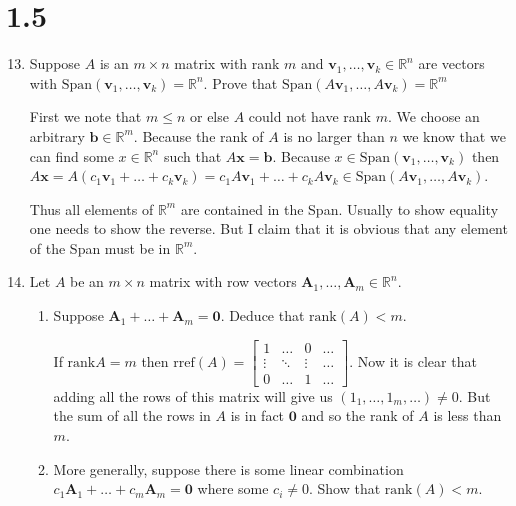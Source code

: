 \documentclass[letterpaper]{article}
\begin{document}
\section*{1.5}
\begin{enumerate}
\setcounter{enumi}{12}
\item
Suppose $A$ is an $m\times n$ matrix with rank $m$ and $\mathbf{v}_1,\dots,\mathbf{v}_k\in \mathbb{R}^n$ are vectors with $\text{Span}(\mathbf{v}_1,\dots,\mathbf{v}_k)=\mathbb{R}^n$. Prove that $\text{Span}(A\mathbf{v}_1,\dots,A\mathbf{v}_k)=\mathbb{R}^m$

First we note that $m\le n$ or else $A$ could not have rank $m$.
We choose an arbitrary $\mathbf{b}\in \mathbb{R}^m$. Because the rank of $A$ is no larger than $n$ we know that we can find some $x\in \mathbb{R}^n$ such that $A\mathbf{x}=\mathbf{b}$. Because $x\in \text{Span}(\mathbf{v}_1,\dots,\mathbf{v}_k)$ then $A\mathbf{x}=A(c_1\mathbf{v}_1+\dots+c_k\mathbf{v}_k)=c_1A\mathbf{v}_1+\dots+c_kA\mathbf{v}_k\in \text{Span}(A\mathbf{v}_1,\dots,A\mathbf{v}_k)$.

Thus all elements of $\mathbb{R}^m$ are contained in the Span. Usually to show equality one needs to show the reverse. But I claim that it is obvious that any element of the Span must be in $\mathbb{R}^m$.
\item
Let $A$ be an $m\times n$ matrix with row vectors $\mathbf{A}_1,\dots,\mathbf{A}_m\in\mathbb{R}^n$.
  \begin{enumerate}
  \item
  Suppose $\mathbf{A}_1+\dots+\mathbf{A}_m=\mathbf{0}$. Deduce that $\text{rank}(A)<m$.

  If $\text{rank}A=m$ then
  $\text{rref}(A)=\left[\begin{array}{cccc}
  1&\dots&0&\dots\\
  \vdots&\ddots&\vdots&\dots\\
  0&\dots&1&\dots
  \end{array}\right]$. Now it is clear that adding all the rows of this matrix will give us $(1_1,\dots,1_m,\dots)\ne 0$. But the sum of all the rows in $A$ is in fact $\mathbf{0}$ and so the rank of $A$ is less than $m$.
  \item
  More generally, suppose there is some linear combination $c_1\mathbf{A}_1+\dots+c_m\mathbf{A}_m=\mathbf{0}$ where some $c_i\ne 0$. Show that $\text{rank}(A)<m$.


\end{enumerate}
\end{enumerate}
\end{document}
